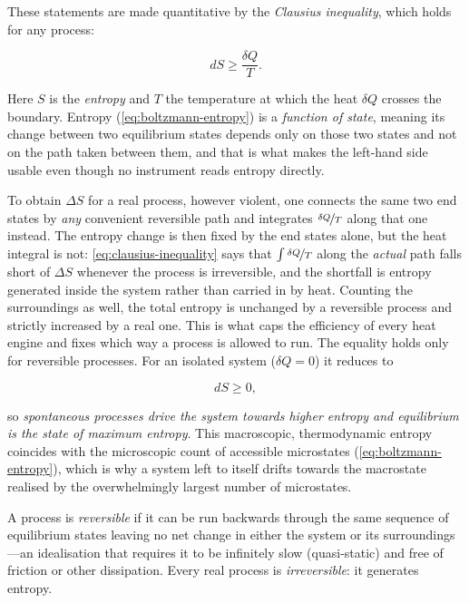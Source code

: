         These statements are made quantitative by the \emph{Clausius inequality}, which holds for any process:

        \begin{equation}\label{eq:clausius-inequality}
            dS \geq \frac{\delta Q}{T}.
        \end{equation}

        Here $S$ is the \emph{entropy} and $T$ the temperature at which the heat $\delta Q$ crosses the boundary. Entropy (\cref{eq:boltzmann-entropy}) is a \emph{function of state}, meaning its change between two equilibrium states depends only on those two states and not on the path taken between them, and that is what makes the left-hand side usable even though no instrument reads entropy directly.
        
        To obtain $\Delta S$ for a real process, however violent, one connects the same two end states by \emph{any} convenient reversible path and integrates $\nicefrac{\delta Q}{T}$ along that one instead. The entropy change is then fixed by the end states alone, but the heat integral is not: \cref{eq:clausius-inequality} says that $\int \nicefrac{\delta Q}{T}$ along the \emph{actual} path falls short of $\Delta S$ whenever the process is irreversible, and the shortfall is entropy generated inside the system rather than carried in by heat. Counting the surroundings as well, the total entropy is unchanged by a reversible process and strictly increased by a real one. This is what caps the efficiency of every heat engine and fixes which way a process is allowed to run. The equality holds only for reversible processes. For an isolated system ($\delta Q = 0$) it reduces to

        \begin{equation*}
            dS \geq 0,
        \end{equation*}

        so \emph{spontaneous processes drive the system towards higher entropy and equilibrium is the state of maximum entropy}. This macroscopic, thermodynamic entropy coincides with the microscopic count of accessible microstates (\cref{eq:boltzmann-entropy}), which is why a system left to itself drifts towards the macrostate realised by the overwhelmingly largest number of microstates.

        A process is \emph{reversible} if it can be run backwards through the same sequence of equilibrium states leaving no net change in either the system or its surroundings---an idealisation that requires it to be infinitely slow (quasi-static) and free of friction or other dissipation. Every real process is \emph{irreversible}: it generates entropy.


